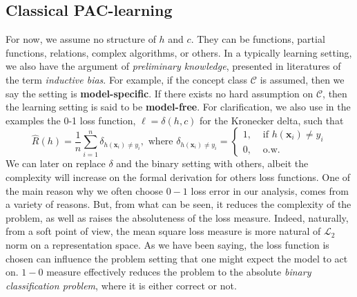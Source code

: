 \subsection{Classical PAC-learning}
For now, we assume no structure of $h$ and $c$. They can be functions, partial functions, relations, complex algorithms, or others. In a typically learning setting, we also have the argument of \textit{preliminary knowledge}, presented in literatures of the term \textit{inductive bias}. For example, if the concept class $\mathcal{C}$ is assumed, then we say the setting is \textbf{model-specific}. If there exists no hard assumption on $\mathcal{C}$, then the learning setting is said to be \textbf{model-free}. For clarification, we also use in the examples the 0-1 loss function, $\ell= \delta(h,c)$ for the Kronecker delta, such that \begin{equation}
    \hat{R}(h)=\frac{1}{n}\sum^n_{i=1}\delta_{h(\mathbf{x}_i)\ne y_i}, \mbox{ where }\delta_{h(\mathbf{x}_i)\ne y_i}=\begin{cases}
        1,&\mbox{ if $h(\mathbf{x}_i)\ne y_i$}\\
        0,&\mbox{ o.w.}
        \end{cases}
\end{equation} 
We can later on replace $\delta$ and the binary setting with others, albeit the complexity will increase on the formal derivation for others loss functions. One of the main reason why we often choose $0-1$ loss error in our analysis, comes from a variety of reasons. But, from what can be seen, it reduces the complexity of the problem, as well as raises the absoluteness of the loss measure. Indeed, naturally, from a soft point of view, the mean square loss measure is more natural of $\mathcal{L}_{2}$ norm on a representation space. As we have been saying, the loss function is chosen can influence the problem setting that one might expect the model to act on. $1-0$ measure effectively reduces the problem to the absolute \textit{binary classification problem}, where it is either correct or not. 

